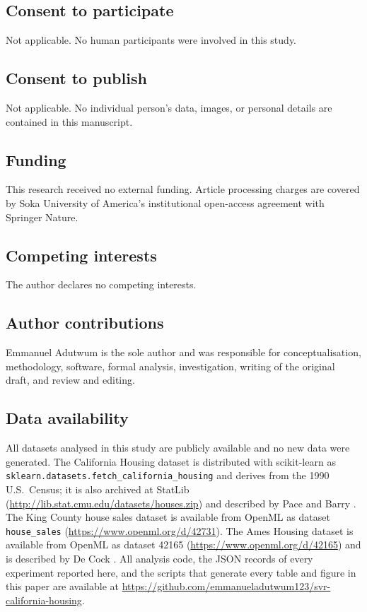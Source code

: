 \documentclass[pdflatex,sn-mathphys-num]{sn-jnl}
\begin{document}
\subsection*{Consent to participate}
Not applicable. No human participants were involved in this study.

\subsection*{Consent to publish}
Not applicable. No individual person's data, images, or personal details are contained in this manuscript.

\subsection*{Funding}
This research received no external funding. Article processing charges are covered by Soka University of America's institutional open-access agreement with Springer Nature.

\subsection*{Competing interests}
The author declares no competing interests.

\subsection*{Author contributions}
Emmanuel Adutwum is the sole author and was responsible for conceptualisation, methodology, software, formal analysis, investigation, writing of the original draft, and review and editing.

\subsection*{Data availability}
All datasets analysed in this study are publicly available and no new data were generated. The California Housing dataset is distributed with scikit-learn as \texttt{sklearn.datasets.fetch\_california\_housing} and derives from the 1990 U.S.\ Census; it is also archived at StatLib (\url{http://lib.stat.cmu.edu/datasets/houses.zip}) and described by Pace and Barry \cite{pace1997}. The King County house sales dataset is available from OpenML as dataset \texttt{house\_sales} (\url{https://www.openml.org/d/42731}). The Ames Housing dataset is available from OpenML as dataset 42165 (\url{https://www.openml.org/d/42165}) and is described by De Cock \cite{decock2011}. All analysis code, the JSON records of every experiment reported here, and the scripts that generate every table and figure in this paper are available at \url{https://github.com/emmanueladutwum123/svr-california-housing}.
\end{document}
